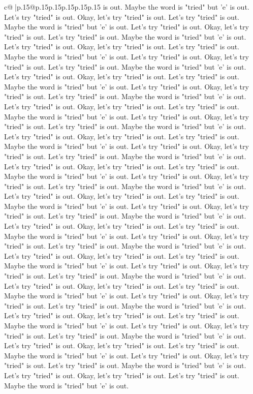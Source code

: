\documentclass{article}
\begin{document}
{\begin{supertabular}{c@{$\;$}|p{.15\linewidth}@{}p{.15\linewidth}p{.15\linewidth}p{.15\linewidth}p{.15\linewidth}p{.15\linewidth}}
{{{is out. Maybe the word is "tried" but 'e' is out. Let's try "tried" is out. Okay, let's try "tried" is out. Let's try "tried" is out. Maybe the word is "tried" but 'e' is out. Let's try "tried" is out. Okay, let's try "tried" is out. Let's try "tried" is out. Maybe the word is "tried" but 'e' is out. Let's try "tried" is out. Okay, let's try "tried" is out. Let's try "tried" is out. Maybe the word is "tried" but 'e' is out. Let's try "tried" is out. Okay, let's try "tried" is out. Let's try "tried" is out. Maybe the word is "tried" but 'e' is out. Let's try "tried" is out. Okay, let's try "tried" is out. Let's try "tried" is out. Maybe the word is "tried" but 'e' is out. Let's try "tried" is out. Okay, let's try "tried" is out. Let's try "tried" is out. Maybe the word is "tried" but 'e' is out. Let's try "tried" is out. Okay, let's try "tried" is out. Let's try "tried" is out. Maybe the word is "tried" but 'e' is out. Let's try "tried" is out. Okay, let's try "tried" is out. Let's try "tried" is out. Maybe the word is "tried" but 'e' is out. Let's try "tried" is out. Okay, let's try "tried" is out. Let's try "tried" is out. Maybe the word is "tried" but 'e' is out. Let's try "tried" is out. Okay, let's try "tried" is out. Let's try "tried" is out. Maybe the word is "tried" but 'e' is out. Let's try "tried" is out. Okay, let's try "tried" is out. Let's try "tried" is out. Maybe the word is "tried" but 'e' is out. Let's try "tried" is out. Okay, let's try "tried" is out. Let's try "tried" is out. Maybe the word is "tried" but 'e' is out. Let's try "tried" is out. Okay, let's try "tried" is out. Let's try "tried" is out. Maybe the word is "tried" but 'e' is out. Let's try "tried" is out. Okay, let's try "tried" is out. Let's try "tried" is out. Maybe the word is "tried" but 'e' is out. Let's try "tried" is out. Okay, let's try "tried" is out. Let's try "tried" is out. Maybe the word is "tried" but 'e' is out. Let's try "tried" is out. Okay, let's try "tried" is out. Let's try "tried" is out. Maybe the word is "tried" but 'e' is out. Let's try "tried" is out. Okay, let's try "tried" is out. Let's try "tried" is out. Maybe the word is "tried" but 'e' is out. Let's try "tried" is out. Okay, let's try "tried" is out. Let's try "tried" is out. Maybe the word is "tried" but 'e' is out. Let's try "tried" is out. Okay, let's try "tried" is out. Let's try "tried" is out. Maybe the word is "tried" but 'e' is out. Let's try "tried" is out. Okay, let's try "tried" is out. Let's try "tried" is out. Maybe the word is "tried" but 'e' is out. Let's try "tried" is out. Okay, let's try "tried" is out. Let's try "tried" is out. Maybe the word is "tried" but 'e' is out. Let's try "tried" is out. Okay, let's try "tried" is out. Let's try "tried" is out. Maybe the word is "tried" but 'e' is out. Let's try "tried" is out. Okay, let's try "tried" is out. Let's try "tried" is out. Maybe the word is "tried" but 'e' is out. Let's try "tried" is out. Okay, let's try "tried" is out. Let's try "tried" is out. Maybe the word is "tried" but 'e' is out. Let's try "tried" is out. Okay, let's try "tried" is out. Let's try "tried" is out. Maybe the word is "tried" but 'e' is out. }}}
\end{supertabular}}
\end{document}

